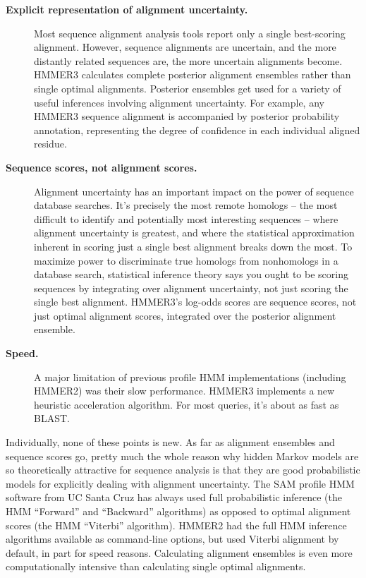 \begin{description}
\item[\textbf{Explicit representation of alignment uncertainty.}]
  Most sequence alignment analysis tools report only a single
  best-scoring alignment. However, sequence alignments are uncertain,
  and the more distantly related sequences are, the more uncertain
  alignments become. HMMER3 calculates complete posterior alignment
  ensembles rather than single optimal alignments. Posterior ensembles
  get used for a variety of useful inferences involving alignment
  uncertainty. For example, any HMMER3 sequence alignment is
  accompanied by posterior probability annotation, representing the
  degree of confidence in each individual aligned residue.

\item[\textbf{Sequence scores, not alignment scores.}]  Alignment
  uncertainty has an important impact on the power of sequence
  database searches.  It's precisely the most remote homologs -- the
  most difficult to identify and potentially most interesting
  sequences -- where alignment uncertainty is greatest, and where the
  statistical approximation inherent in scoring just a single best
  alignment breaks down the most. To maximize power to discriminate
  true homologs from nonhomologs in a database search, statistical
  inference theory says you ought to be scoring sequences by
  integrating over alignment uncertainty, not just scoring the single
  best alignment. HMMER3's log-odds scores are sequence scores, not
  just optimal alignment scores, integrated over the posterior
  alignment ensemble.
  
\item[\textbf{Speed.}] A major limitation of previous profile HMM
  implementations (including HMMER2) was their slow
  performance. HMMER3 implements a new heuristic acceleration
  algorithm. For most queries, it's about as fast as BLAST.
\end{description}

Individually, none of these points is new. As far as alignment
ensembles and sequence scores go, pretty much the whole reason why
hidden Markov models are so theoretically attractive for sequence
analysis is that they are good probabilistic models for explicitly
dealing with alignment uncertainty. The SAM profile HMM software from
UC Santa Cruz has always used full probabilistic inference (the HMM
``Forward'' and ``Backward'' algorithms) as opposed to optimal
alignment scores (the HMM ``Viterbi'' algorithm). HMMER2 had the full
HMM inference algorithms available as command-line options, but used
Viterbi alignment by default, in part for speed reasons. Calculating
alignment ensembles is even more computationally intensive than
calculating single optimal alignments.

